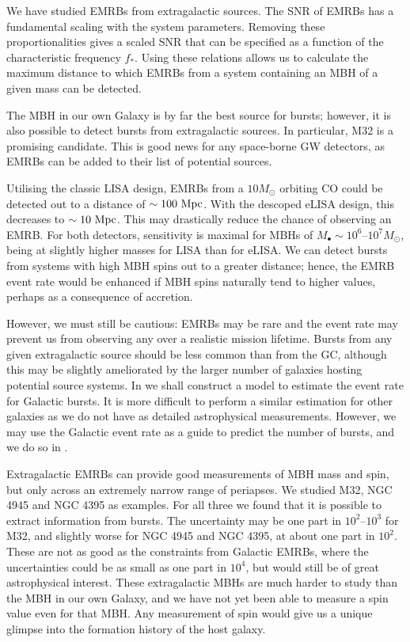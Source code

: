 We have studied EMRBs from extragalactic sources. The SNR of EMRBs has a fundamental scaling with the system parameters. Removing these proportionalities gives a scaled SNR that can be specified as a function of the characteristic frequency $f_\ast$. Using these relations allows us to calculate the maximum distance to which EMRBs from a system containing an MBH of a given mass can be detected.

The MBH in our own Galaxy is by far the best source for bursts; however, it is also possible to detect bursts from extragalactic sources. In particular, M32 is a promising candidate. This is good news for any space-borne GW detectors, as EMRBs can be added to their list of potential sources.

Utilising the classic LISA design, EMRBs from a $10 M_\odot$ orbiting CO could be detected out to a distance of $\sim 100~\mathrm{Mpc}$. With the descoped eLISA design, this decreases to $\sim 10~\mathrm{Mpc}$. This may drastically reduce the chance of observing an EMRB. For both detectors, sensitivity is maximal for MBHs of $M_\bullet \sim 10^6$--$10^7 M_\odot$, being at slightly higher masses for LISA than for eLISA. We can detect bursts from systems with high MBH spins out to a greater distance; hence, the EMRB event rate would be enhanced if MBH spins naturally tend to higher values, perhaps as a consequence of accretion.

However, we must still be cautious: EMRBs may be rare and the event rate may prevent us from observing any over a realistic mission lifetime. Bursts from any given extragalactic source should be less common than from the GC, although this may be slightly ameliorated by the larger number of galaxies hosting potential source systems. In  we shall construct a model to estimate the event rate for Galactic bursts. It is more difficult to perform a similar estimation for other galaxies as we do not have as detailed astrophysical measurements. However, we may use the Galactic event rate as a guide to predict the number of bursts, and we do so in .

Extragalactic EMRBs can provide good measurements of MBH mass and spin, but only across an extremely narrow range of periapses. We studied M32, NGC 4945 and NGC 4395 as examples. For all three we found that it is possible to extract information from bursts. The uncertainty may be one part in $10^2$--$10^3$ for M32, and slightly worse for NGC 4945 and NGC 4395, at about one part in $10^2$. These are not as good as the constraints from Galactic EMRBs, where the uncertainties could be as small as one part in $10^4$, but would still be of great astrophysical interest. These extragalactic MBHs are much harder to study than the MBH in our own Galaxy, and we have not yet been able to measure a spin value even for that MBH. Any measurement of spin would give us a unique glimpse into the formation history of the host galaxy.

